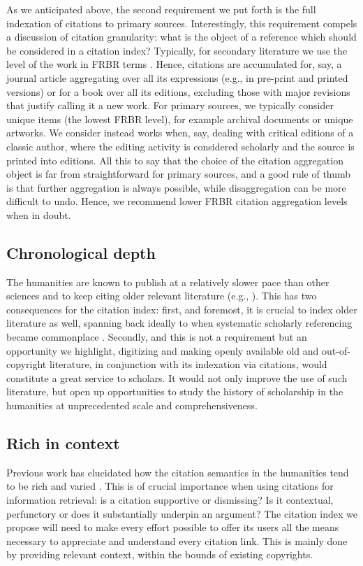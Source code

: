 As we anticipated above, the second requirement we put forth is the full indexation of citations to primary sources. Interestingly, this requirement compels a discussion of citation granularity: what is the object of a reference which should be considered in a citation index? Typically, for secondary literature we use the level of the work in FRBR terms \cite{ifla_functional_1997}. Hence, citations are accumulated for, say, a journal article aggregating over all its expressions (e.g., in pre-print and printed versions) or for a book over all its editions, excluding those with major revisions that justify calling it a new work. For primary sources, we typically consider unique items (the lowest FRBR level), for example archival documents or unique artworks. We consider instead works when, say, dealing with critical editions of a classic author, where the editing activity is considered scholarly and the source is printed into editions. All this to say that the choice of the citation aggregation object is far from straightforward for primary sources, and a good rule of thumb is that further aggregation is always possible, while disaggregation can be more difficult to undo. Hence, we recommend lower FRBR citation aggregation levels when in doubt.

\subsection{Chronological depth}
The humanities are known to publish at a relatively slower pace than other sciences and to keep citing older relevant literature (e.g., \cite{nederhof_bibliometric_2006, hellqvist_referencing_2010}). This has two consequences for the citation index: first, and foremost, it is crucial to index older literature as well, spanning back ideally to when systematic scholarly referencing became commonplace \cite{grafton_footnote_1999}. Secondly, and this is not a requirement but an opportunity we highlight, digitizing and making openly available old and out-of-copyright literature, in conjunction with its indexation via citations, would constitute a great service to scholars. It would not only improve the use of such literature, but open up opportunities to study the history of scholarship in the humanities at unprecedented scale and comprehensiveness.

\subsection{Rich in context}
Previous work has elucidated how the citation semantics in the humanities tend to be rich and varied \cite{hellqvist_referencing_2010}. This is of crucial importance when using citations for information retrieval: is a citation supportive or dismissing? Is it contextual, perfunctory or does it substantially underpin an argument? The citation index we propose will need to make every effort possible to offer its users all the means necessary to appreciate and understand every citation link. This is mainly done by providing relevant context, within the bounds of existing copyrights.
 
